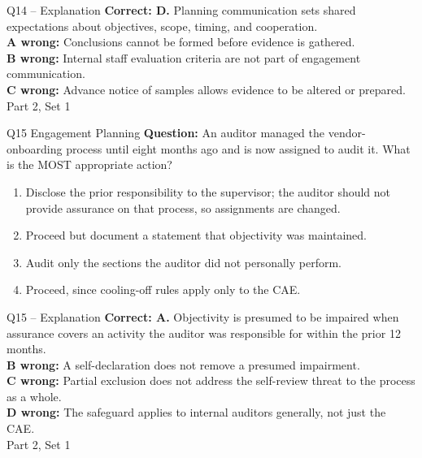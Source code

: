 \documentclass[aspectratio=169,10pt]{beamer}
\begin{document}
\begin{frame}[t]{Q14 -- Explanation}
	\footnotesize
	\textbf{Correct: D.} Planning communication sets shared expectations about objectives, scope, timing, and cooperation. \\[5pt]
\textbf{A wrong:} Conclusions cannot be formed before evidence is gathered. \\[3pt]
\textbf{B wrong:} Internal staff evaluation criteria are not part of engagement communication. \\[3pt]
\textbf{C wrong:} Advance notice of samples allows evidence to be altered or prepared. \\[3pt]
	\vfill {\tiny Part 2, Set 1}
\end{frame}
\begin{frame}[t]{Q15 \hfill {\scriptsize Engagement Planning}}
	\small
	\textbf{Question:} An auditor managed the vendor-onboarding process until eight months ago and is now assigned to audit it. What is the MOST appropriate action?
	\begin{enumerate}[label=\Alph*.,itemsep=1pt,topsep=3pt]
			\item Disclose the prior responsibility to the supervisor; the auditor should not provide assurance on that process, so assignments are changed.
			\item Proceed but document a statement that objectivity was maintained.
			\item Audit only the sections the auditor did not personally perform.
			\item Proceed, since cooling-off rules apply only to the CAE.
	\end{enumerate}
\end{frame}
\begin{frame}[t]{Q15 -- Explanation}
	\footnotesize
	\textbf{Correct: A.} Objectivity is presumed to be impaired when assurance covers an activity the auditor was responsible for within the prior 12 months. \\[5pt]
\textbf{B wrong:} A self-declaration does not remove a presumed impairment. \\[3pt]
\textbf{C wrong:} Partial exclusion does not address the self-review threat to the process as a whole. \\[3pt]
\textbf{D wrong:} The safeguard applies to internal auditors generally, not just the CAE. \\[3pt]
	\vfill {\tiny Part 2, Set 1}
\end{frame}
\end{document}
